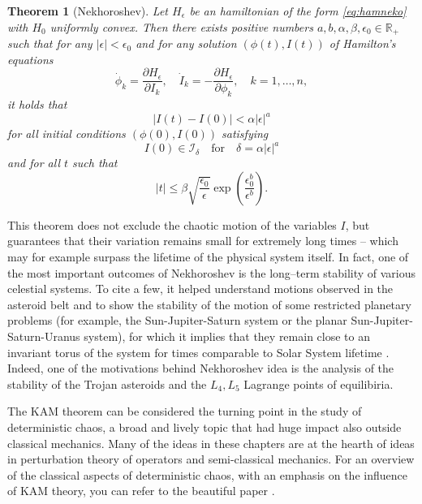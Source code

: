 \documentclass[english,fontsize=11pt,paper=b5]{scrbook}
\newtheorem{theorem}{Theorem}[chapter]
\theoremstyle{definition}
\begin{document}
      \begin{theorem}[Nekhoroshev]
        Let $H_\epsilon$ be an hamiltonian of the form \eqref{eq:hamneko} with $H_0$ uniformly convex.
        Then there exists positive numbers $a,b,\alpha,\beta,\epsilon_0\in\mathbb{R}_+$ such that for any $|\epsilon|< \epsilon_0$ and for any solution $(\phi(t), I(t))$ of Hamilton's equations
        \begin{equation}
          \dot \phi_k = \frac{\partial H_\epsilon}{\partial I_k}, \quad
          \dot I_k = - \frac{\partial H_\epsilon}{\partial \phi_k}, \quad
          k=1,\ldots,n,
        \end{equation}
        it holds that
        \begin{equation}
          |I(t)-I(0)| < \alpha |\epsilon|^a
        \end{equation}
        for all initial conditions $(\phi(0), I(0))$ satisfying
        \begin{equation}
          I(0) \in \mathcal{I}_\delta\quad\mbox{for}\quad \delta = \alpha|\epsilon|^a
        \end{equation}
        and for all $t$ such that
        \begin{equation}
          |t| \leq \beta \sqrt{\frac{\epsilon_0}\epsilon} \exp\left(\frac{\epsilon^b_0}{\epsilon^b}\right).
        \end{equation}
      \end{theorem}

      This theorem does not exclude the chaotic motion of the variables $I$, but guarantees that their variation remains small for extremely long times -- which may for example surpass the lifetime of the physical system itself.
      In fact, one of the most important outcomes of Nekhoroshev is the long--term stability of various celestial systems. To cite a few, it helped understand motions observed in the asteroid belt and to show the stability of the motion of some restricted planetary problems (for example, the Sun-Jupiter-Saturn system or the planar Sun-Jupiter-Saturn-Uranus system), for which it implies that they remain close to an invariant torus of the system for times comparable to Solar System lifetime \cite{Guzzo2015}.
      Indeed, one of the motivations behind Nekhoroshev idea is the analysis of the stability of the Trojan asteroids and the $L_4, L_5$ Lagrange points of equilibiria.

      The KAM theorem can be considered the turning point in the study of deterministic chaos, a broad and lively topic that had huge impact also outside classical mechanics.
      Many of the ideas in these chapters are at the hearth of ideas in perturbation theory of operators and semi-classical mechanics.
      For an overview of the classical aspects of deterministic chaos, with an emphasis on the influence of KAM theory, you can refer to the beautiful paper \cite{zbMATH05911037}.
\end{document}
